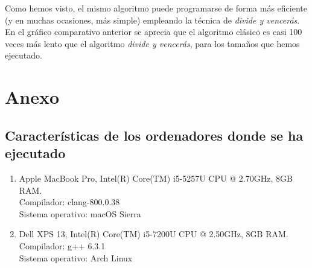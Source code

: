 \documentclass[11pt]{article}
\begin{document}
Como hemos visto, el mismo algoritmo puede programarse de forma más eficiente (y en muchas ocasiones, más simple) empleando la técnica de \textit{divide y vencerás}. En el gráfico comparativo anterior se aprecia que el algoritmo clásico es casi 100 veces más lento que el algoritmo \textit{divide y vencerás}, para los tamaños que hemos ejecutado.

\newpage

\section*{Anexo}
\subsection*{Características de los ordenadores donde se ha ejecutado}

\vspace{0.5em}

\begin{enumerate}
\item Apple MacBook Pro, Intel(R) Core(TM) i5-5257U CPU @ 2.70GHz, 8GB RAM.\\  Compilador: clang-800.0.38 \\
  Sistema operativo: macOS Sierra
\item Dell XPS 13, Intel(R) Core(TM) i5-7200U CPU @ 2.50GHz, 8GB RAM.\\
  Compilador: g++ 6.3.1\\
  Sistema operativo: Arch Linux
\end{enumerate}
\end{document}
